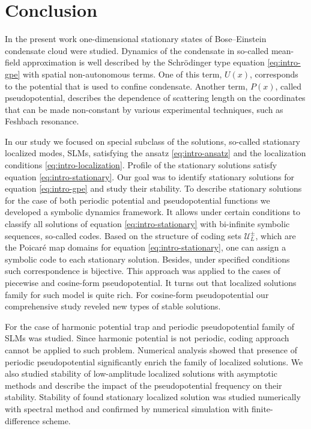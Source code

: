 \chapter*{Conclusion}
\label{conclusion}

In the present work one-dimensional stationary states of Bose--Einstein condensate cloud were studied.
Dynamics of the condensate in so-called mean-field ap­proximation is well described by the Schr\"odinger type equation \eqref{eq:intro-gpe} with spatial non-au­tonomous terms.
One of this term, $U(x)$, corresponds to the potential that is used to confine condensate.
Another term, $P(x)$, called pseudopotential, describes the dependence of scattering length on the coordinates that can be made non-constant by various experimental techniques, such as Feshbach resonance.

In our study we focused on special subclass of the solutions, so-called stationary localized modes, SLMs, satisfying the ansatz \eqref{eq:intro-ansatz} and the localization conditions \eqref{eq:intro-localization}.
Profile of the stationary solutions satisfy equation \eqref{eq:intro-stationary}.
Our goal was to identify stationary solutions for equation \eqref{eq:intro-gpe} and study their stability.
To describe stationary solutions for the case of both periodic potential and pseudopotential functions we developed a symbolic dynamics framework.
It allows under certain conditions to classify all solutions of equation \eqref{eq:intro-stationary} with bi-infinite symbolic sequences, so-called codes.
Based on the structure of coding sets $\mathscr{U}_L^{\pm}$, which are the Poicar\'e map domains for equation \eqref{eq:intro-stationary}, one can assign a symbolic code to each stationary solution.
Besides, under specified conditions such correspondence is bijective.
This approach was applied to the cases of piecewise and cosine-form pseudopotential.
It turns out that localized solutions family for such model is quite rich.
For cosine-form pseudopotential our comprehensive study reveled new types of stable solutions.

For the case of harmonic potential trap and periodic pseudopotential family of SLMs was studied.
Since harmonic potential is not periodic, coding approach cannot be applied to such problem.
Numerical analysis showed that presence of periodic pseudopotential significantly enrich the family of localized solutions.
We also studied stability of low-amplitude localized solutions with asymptotic methods and describe the impact of the pseudopotential frequency on their  stability.
Stability of found stationary localized solution was studied numerically with spectral method and confirmed by numerical simulation with finite-difference scheme.


